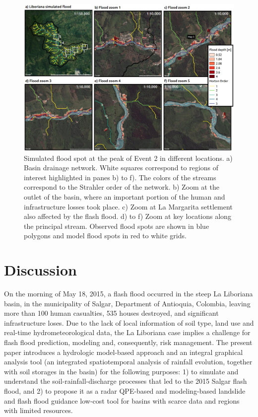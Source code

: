 \documentclass[hess, manuscript]{copernicus}
\begin{document}
\begin{figure}[t!]
\centering
 \includegraphics[width=12cm]{Figures/Manchas2.png}
 \caption{Simulated flood spot at the peak of Event 2 in different locations. a) Basin drainage network. White squares correspond to regions of interest highlighted in panes b) to f). The colors of the streams correspond to the Strahler order of the network. b) Zoom at the outlet of the basin, where an important portion of the human and infrastructure losses took place. c) Zoom at La Margarita settlement also affected by the flash flood. d) to f) Zoom at key locations along the principal stream. Observed flood spots are shown in blue polygons and model flood spots in red to white grids.}
    \label{fig:SimFloodSpots}
\end{figure}


\section{Discussion}
\label{sec:discussion}

On the morning of May 18, 2015, a flash flood occurred in the steep La Liboriana basin, in the municipality of Salgar, Department of Antioquia, Colombia, leaving more than 100 human casualties, 535 houses destroyed, and significant infrastructure loses.  Due to the lack of local information of soil type, land use and real-time hydrometeorological data, the La Liboriana case implies a challenge for flash flood prediction, modeling and, consequently, risk management. The present paper introduces a hydrologic model-based approach and an integral graphical analysis tool (an integrated spatiotemporal analysis of rainfall evolution, together with soil storages in the basin) for the following purposes: 1) to simulate and understand the  soil-rainfall-discharge processes that led to the 2015 Salgar flash flood, and 2) to propose it as a radar QPE-based and modeling-based landslide and flash flood guidance low-cost tool for basins with scarce data and regions with limited resources.\\
\end{document}

